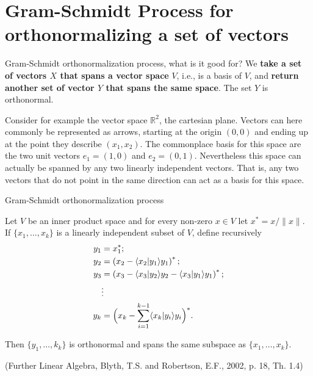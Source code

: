 \documentclass{beamer}
\begin{document}
\section[Gram-Schmidt Process]{Gram-Schmidt Process for orthonormalizing a set of vectors}

\begin{frame}{Gram-Schmidt orthonormalization process, what is it good for?}
    We \textbf{take a set of vectors $X$ that spans a vector space} $V$, i.e., is a basis of $V$, and \textbf{return another set of vector $Y$ that spans the same space}. The set $Y$ is orthonormal.\par
    Consider for example the vector space $\mathbb{R}^2$, the cartesian plane. Vectors can here commonly be represented as arrows, starting at the origin $(0,0)$ and ending up at the point they describe $(x_1, x_2)$. The commonplace basis for this space are the two unit vectors $e_1 = (1,0)$ and $e_2 = (0,1)$. Nevertheless this space can actually be spanned by any two linearly independent vectors. That is, any two vectors that do not point in the same direction can act as a basis for this space.
\end{frame}

\begin{frame}{Gram-Schmidt orthonormalization process}
    \small
    \begin{theorem}
        Let $V$ be an inner product space and for every non-zero $x \in V$ let $x^* = x / \| x \|$. If $\{x_1 , \dots , x_k\}$ is a linearly independent subset of $V$, define recursively
        \begin{align*}
            y_1 &= x_1^*;\\
            y_2 &= \left( x_2 - \langle x_2 | y_1 \rangle y_1 \right)^*;\\
            y_3 &= \left( x_3 - \langle x_3 | y_2 \rangle y_2 - \langle x_3 | y_1 \rangle y_1 \right)^*;\\
            &\vdots \\
            y_k &= \Bigl( x_k - \sum_{i=1}^{k-1} \langle x_k | y_i \rangle y_i \Bigl)^*.
        \end{align*}

        Then $\{y_1, \dots, k_k\}$ is orthonormal and spans the same subspace as $\{x_1, \dots, x_k\}$.

        \par \vspace{2mm} (Further Linear Algebra, Blyth, T.S. and Robertson, E.F., 2002, p. 18, Th. 1.4)
    \end{theorem}
\end{frame}
\end{document}
